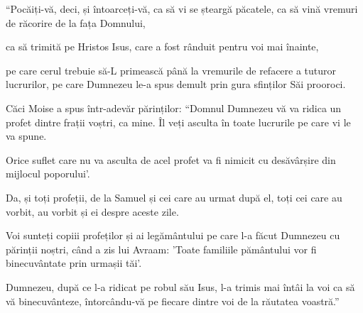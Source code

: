 {\par }{\PP {}“Pocăiți-vă, deci, și întoarceți-vă, ca să vi se șteargă păcatele, ca să vină vremuri de răcorire de la fața Domnului,

ca să trimită pe Hristos Isus, care a fost rânduit pentru voi mai înainte,

pe care cerul trebuie să-L primească până la vremurile de refacere a tuturor lucrurilor, pe care Dumnezeu le-a spus demult prin gura sfinților Săi prooroci.

Căci Moise a spus într-adevăr părinților: “Domnul Dumnezeu vă va ridica un profet dintre frații voștri, ca mine. Îl veți asculta în toate lucrurile pe care vi le va spune.

Orice suflet care nu va asculta de acel profet va fi nimicit cu desăvârșire din mijlocul poporului'.

Da, și toți profeții, de la Samuel și cei care au urmat după el, toți cei care au vorbit, au vorbit și ei despre aceste zile.

Voi sunteți copiii profeților și ai legământului pe care l-a făcut Dumnezeu cu părinții noștri, când a zis lui Avraam: 'Toate familiile pământului vor fi binecuvântate prin urmașii tăi'.

Dumnezeu, după ce l-a ridicat pe robul său Isus, l-a trimis mai întâi la voi ca să vă binecuvânteze, întorcându-vă pe fiecare dintre voi de la răutatea voastră.”



\par }
